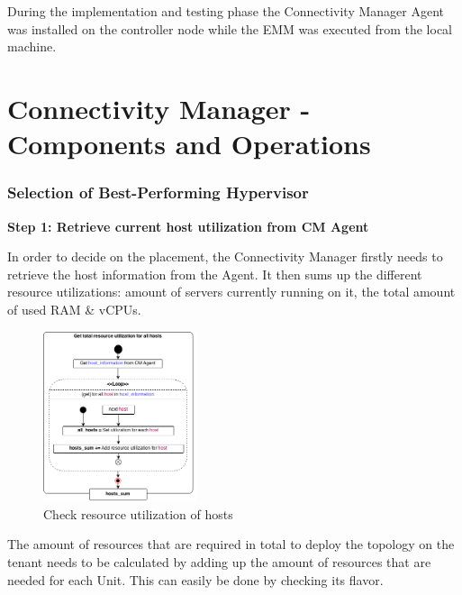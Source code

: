 During the implementation and testing phase the Connectivity Manager Agent was installed on the controller node while the EMM was executed from the local machine.

\section{Connectivity Manager - Components and Operations}

\subsubsection{Selection of Best-Performing Hypervisor}


\textbf{Step 1: Retrieve current host utilization from CM Agent}

In order to decide on the placement, the Connectivity Manager firstly needs to retrieve the host information from the Agent. It then sums up the different resource utilizations: amount of servers currently running on it, the total amount of used RAM \& vCPUs.
\begin{figure}[H]
\centering

\includegraphics[width=0.4\textwidth]{images/implementation/cm_get_host_utilization}

\caption{Check resource utilization of hosts}
\end{figure}

The amount of resources that are required in total to deploy the topology on the tenant needs to be calculated by adding up the amount of resources that are needed for each Unit. This can easily be done by checking its flavor.

